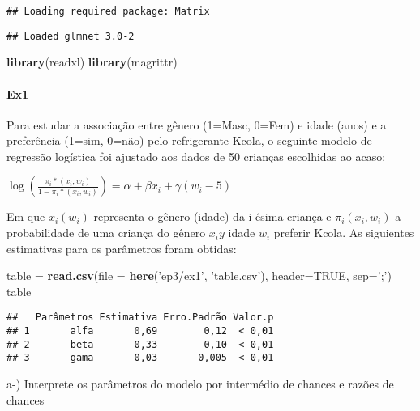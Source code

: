 \documentclass[]{article}
\newenvironment{Shaded}{\begin{snugshade}}{\end{snugshade}}
\newcommand{\DataTypeTok}[1]{\textcolor[rgb]{0.13,0.29,0.53}{#1}}
\newcommand{\KeywordTok}[1]{\textcolor[rgb]{0.13,0.29,0.53}{\textbf{#1}}}
\newcommand{\NormalTok}[1]{#1}
\newcommand{\OtherTok}[1]{\textcolor[rgb]{0.56,0.35,0.01}{#1}}
\newcommand{\StringTok}[1]{\textcolor[rgb]{0.31,0.60,0.02}{#1}}
\let\oldparagraph\paragraph
\renewcommand{\paragraph}[1]{\oldparagraph{#1}\mbox{}}
\begin{document}
\begin{verbatim}
## Loading required package: Matrix
\end{verbatim}

\begin{verbatim}
## Loaded glmnet 3.0-2
\end{verbatim}

\begin{Shaded}
\begin{Highlighting}[]
\KeywordTok{library}\NormalTok{(readxl)}
\KeywordTok{library}\NormalTok{(magrittr)}
\end{Highlighting}
\end{Shaded}

\hypertarget{ex1}{%
\paragraph{Ex1}\label{ex1}}

Para estudar a associação entre gênero (1=Masc, 0=Fem) e idade (anos) e
a preferência (1=sim, 0=não) pelo refrigerante Kcola, o seguinte modelo
de regressão logística foi ajustado aos dados de 50 crianças escolhidas
ao acaso:

\(\log(\frac{\pi_{i}*(x_{i}, w_{i})}{1-\pi_{i}*(x_{i}, w_{i})}) = \alpha + \beta x_{i} + \gamma(w_{i} - 5)\)

Em que \(x_{i}(w_{i})\) representa o gênero (idade) da i-ésima criança e
\(\pi_{i}(x_{i}, w_{i})\) a probabilidade de uma criança do gênero
\(x_{i}y\) idade \(w_{i}\) preferir Kcola. As siguientes estimativas
para os parâmetros foram obtidas:

\begin{Shaded}
\begin{Highlighting}[]
\NormalTok{table =}\StringTok{ }\KeywordTok{read.csv}\NormalTok{(}\DataTypeTok{file =} \KeywordTok{here}\NormalTok{(}\StringTok{'ep3/ex1'}\NormalTok{, }\StringTok{'table.csv'}\NormalTok{), }\DataTypeTok{header=}\OtherTok{TRUE}\NormalTok{, }\DataTypeTok{sep=}\StringTok{';'}\NormalTok{)}
\NormalTok{table}
\end{Highlighting}
\end{Shaded}

\begin{verbatim}
##   Parâmetros Estimativa Erro.Padrão Valor.p
## 1       alfa       0,69        0,12  < 0,01
## 2       beta       0,33        0,10  < 0,01
## 3       gama      -0,03       0,005  < 0,01
\end{verbatim}

a-) Interprete os parâmetros do modelo por intermédio de chances e
razões de chances
\end{document}
